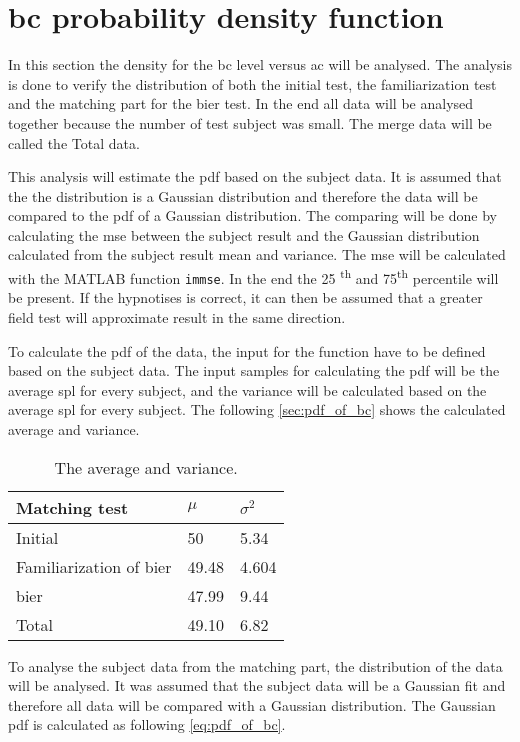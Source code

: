 \section{\gls{bc} probability density function}
In this section the density for the \gls{bc} level versus \gls{ac} will be analysed. The analysis is done to verify the distribution of both the initial test, the familiarization test and the matching part for the \gls{bier} test. In the end all data will be analysed together because the number of test subject was small. The merge data will be called the Total data.

This analysis will estimate the \gls{pdf} based on the subject data. It is assumed that the the distribution is a Gaussian distribution and therefore the data will be compared to the \gls{pdf} of a Gaussian distribution. The comparing will be done by calculating the \gls{mse} between the subject result and the Gaussian distribution calculated from the subject result mean and variance. The \gls{mse} will be calculated with the MATLAB function \texttt{immse}. In the end the 25 \textsuperscript{th} and 75\textsuperscript{th} percentile will be present. If the hypnotises is correct, it can then be assumed that a greater field test will approximate result in the same direction.

To calculate the \gls{pdf} of the data, the input for the function have to be defined based on the subject data. The input samples for calculating the  \gls{pdf} will be the average \gls{spl} for every subject, and the variance will be calculated based on the average \gls{spl} for every subject. The following \autoref{sec:pdf_of_bc} shows the calculated average and variance. 

\begin{table}[H]
\centering
\caption{The average and variance.}
\begin{tabular}{l|ll}
Matching test                 & $\mu$ & $\sigma^2$ \\ \hline
Initial                       & 50    & 5.34       \\
Familiarization of \gls{bier} & 49.48 & 4.604      \\
\gls{bier}                    & 47.99 & 9.44      \\
Total                    & 49.10 & 6.82      
\end{tabular}
\label{sec:pdf_of_bc}
\end{table}

To analyse the subject data from the matching part, the distribution of the data will be analysed. It was assumed that the subject data will be a Gaussian fit and therefore all data will be compared with a Gaussian distribution. The Gaussian \gls{pdf} is calculated as following \autoref{eq:pdf_of_bc}.

